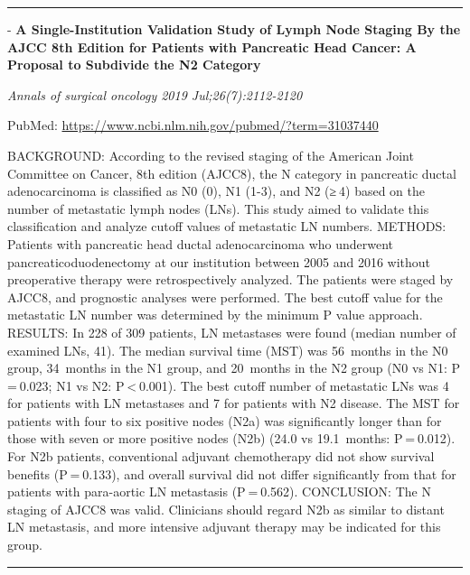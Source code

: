 \documentclass[]{article}
\begin{document}
{}

{}

\begin{center}\rule{0.5\linewidth}{\linethickness}\end{center}

 - \textbf{A Single-Institution Validation Study of Lymph Node Staging
By the AJCC 8th Edition for Patients with Pancreatic Head Cancer: A
Proposal to Subdivide the N2 Category}

\emph{Annals of surgical oncology 2019 Jul;26(7):2112-2120}

PubMed: \url{https://www.ncbi.nlm.nih.gov/pubmed/?term=31037440}

BACKGROUND: According to the revised staging of the American Joint
Committee on Cancer, 8th edition (AJCC8), the N category in pancreatic
ductal adenocarcinoma is classified as N0 (0), N1 (1-3), and N2 (≥ 4)
based on the number of metastatic lymph nodes (LNs). This study aimed to
validate this classification and analyze cutoff values of metastatic LN
numbers. METHODS: Patients with pancreatic head ductal adenocarcinoma
who underwent pancreaticoduodenectomy at our institution between 2005
and 2016 without preoperative therapy were retrospectively analyzed. The
patients were staged by AJCC8, and prognostic analyses were performed.
The best cutoff value for the metastatic LN number was determined by the
minimum P value approach. RESULTS: In 228 of 309 patients, LN metastases
were found (median number of examined LNs, 41). The median survival time
(MST) was 56~months in the N0 group, 34~months in the N1 group, and
20~months in the N2 group (N0 vs N1: P = 0.023; N1 vs N2:
P \textless{} 0.001). The best cutoff number of metastatic LNs was 4 for
patients with LN metastases and 7 for patients with N2 disease. The MST
for patients with four to six positive nodes (N2a) was significantly
longer than for those with seven or more positive nodes (N2b) (24.0 vs
19.1~months: P = 0.012). For N2b patients, conventional adjuvant
chemotherapy did not show survival benefits (P = 0.133), and overall
survival did not differ significantly from that for patients with
para-aortic LN metastasis (P = 0.562). CONCLUSION: The N staging of
AJCC8 was valid. Clinicians should regard N2b as similar to distant LN
metastasis, and more intensive adjuvant therapy may be indicated for
this group.

{}

{}

\begin{center}\rule{0.5\linewidth}{\linethickness}\end{center}
\end{document}
